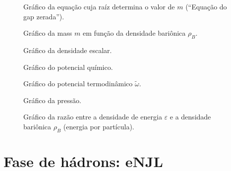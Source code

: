 \begin{figure}
	
	\caption{Gráfico da equação cuja raíz determina o valor de $m$ (``Equação do gap zerada''). \protect}
	\label{Fig:gap_NJL-D_1}
\end{figure}

\begin{figure}
	
	\caption{Gráfico da mass $m$ em função da densidade bariônica $\rho_B$. \protect}
	\label{Fig:mass_NJL-D_1}
\end{figure}


\begin{figure}
	
	\caption{Gráfico da densidade escalar. \protect}
	\label{Fig:scalar_density_NJL-D_1}
\end{figure}

\begin{figure}
	
	\caption{Gráfico do potencial químico. \protect}
	\label{Fig:chemical_potential_NJL-D_1}
\end{figure}

\begin{figure}
	
	\caption{Gráfico do potencial termodinâmico $\tilde{\omega}$. \protect}
	\label{Fig:thermodynamic_potential_NJL-D_1}
\end{figure}

\begin{figure}
	
	\caption{Gráfico da pressão. \protect}
	\label{Fig:pressure_NJL-D_1}
\end{figure}

\begin{figure}
	
	\caption{Gráfico da razão entre a densidade de energia $\varepsilon$ e a densidade bariônica $\rho_B$ (energia por partícula). \protect}
	\label{Fig:energy_density_per_particle_NJL-D_1}
\end{figure}

\FloatBarrier


\section{Fase de hádrons: eNJL}

